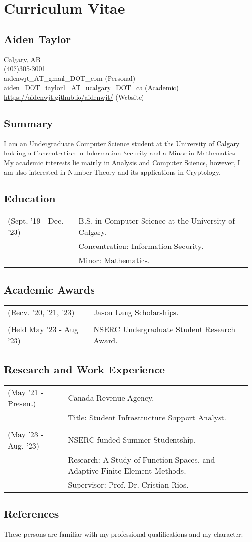 \documentclass[12pt]{article}
\begin{document}
\section*{Curriculum Vitae}
\subsection*{Aiden Taylor}
Calgary, AB \\
(403)305-3001\\
aidenwjt\_AT\_gmail\_DOT\_com (Personal)\\
aiden\_DOT\_taylor1\_AT\_ucalgary\_DOT\_ca (Academic)\\
\url{https://aidenwjt.github.io/aidenwjt/} (Website)
\subsection*{Summary}
I am an Undergraduate Computer Science student at the University of Calgary holding a Concentration in Information Security and a Minor in Mathematics.
My academic interests lie mainly in Analysis and Computer Science, however, I am also interested in Number Theory and its applications in Cryptology.
\subsection*{Education}
\begin{tabular}{l l}
(Sept. '19 - Dec. '23)&B.S. in Computer Science at the University of Calgary.\\
	& Concentration: Information Security.\\
	& Minor: Mathematics.
\end{tabular}
\subsection*{Academic Awards}
\begin{tabular}{l l}
(Recv. '20, '21, '23)&Jason Lang Scholarships.\\
	&\\
(Held May '23 - Aug. '23)& NSERC Undergraduate Student Research Award.
\end{tabular}
\subsection*{Research and Work Experience}
\begin{tabular}{l l}
(May '21 - Present)&Canada Revenue Agency.\\
	&Title: Student Infrastructure Support Analyst.\\
	&\\
(May '23 - Aug. '23)&NSERC-funded Summer Studentship.\\
	&Research: A Study of Function Spaces, and Adaptive Finite Element Methods.\\
	&Supervisor: Prof. Dr. Cristian Rios.
\end{tabular}
\subsection*{References}
These persons are familiar with my professional qualifications and my character:
\end{document}
